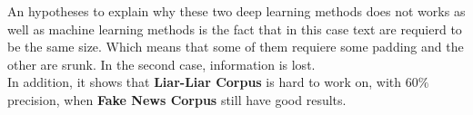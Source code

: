 An hypotheses to explain why these two deep learning methods does not works as well as machine learning methods is the fact that in this case text are requierd to be the same size. Which means that some of them requiere some padding and the other are srunk. In the second case, information is lost. \\

In addition, it shows that \textbf{Liar-Liar Corpus} is hard to work on, with $60\%$ precision, when \textbf{Fake News Corpus} still have good results. 